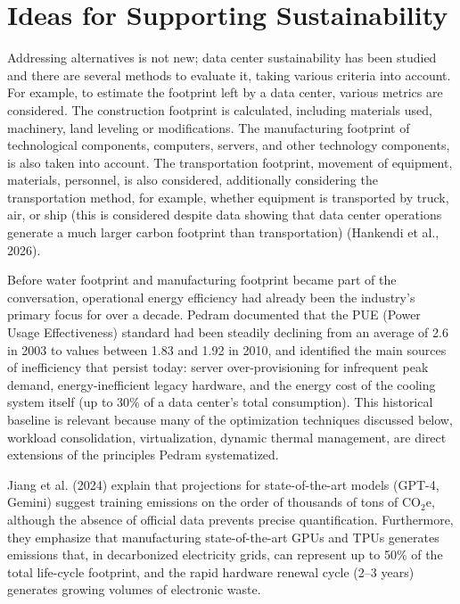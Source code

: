 \documentclass[conference]{IEEEtran}
\begin{document}
\section{Ideas for Supporting Sustainability}

Addressing alternatives is not new; data center sustainability has been studied and there are several methods to evaluate it, taking various criteria into account. For example, to estimate the footprint left by a data center, various metrics are considered. The construction footprint is calculated, including materials used, machinery, land leveling or modifications. The manufacturing footprint of technological components, computers, servers, and other technology components, is also taken into account. The transportation footprint, movement of equipment, materials, personnel, is also considered, additionally considering the transportation method, for example, whether equipment is transported by truck, air, or ship (this is considered despite data showing that data center operations generate a much larger carbon footprint than transportation) (Hankendi et al., 2026).

Before water footprint and manufacturing footprint became part of the conversation, operational energy efficiency had already been the industry's primary focus for over a decade. Pedram \cite{Pedram2012} documented that the PUE (Power Usage Effectiveness) standard had been steadily declining from an average of 2.6 in 2003 to values between 1.83 and 1.92 in 2010, and identified the main sources of inefficiency that persist today: server over-provisioning for infrequent peak demand, energy-inefficient legacy hardware, and the energy cost of the cooling system itself (up to 30\% of a data center's total consumption). This historical baseline is relevant because many of the optimization techniques discussed below, workload consolidation, virtualization, dynamic thermal management, are direct extensions of the principles Pedram \cite{Pedram2012} systematized.

Jiang et al. (2024) explain that projections for state-of-the-art models (GPT-4, Gemini) suggest training emissions on the order of thousands of tons of CO$_2$e, although the absence of official data prevents precise quantification. Furthermore, they emphasize that manufacturing state-of-the-art GPUs and TPUs generates emissions that, in decarbonized electricity grids, can represent up to 50\% of the total life-cycle footprint, and the rapid hardware renewal cycle (2–3 years) generates growing volumes of electronic waste.
\end{document}
